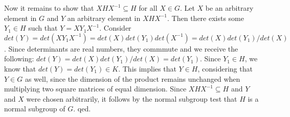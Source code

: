 \documentclass{article}
\begin{document}
Now it remains to show that $XHX^{-1} \subseteq H$ for all $X \in G$. Let $X$ be an arbitrary element in $G$ and $Y$ an arbitrary element in $XHX^{-1}$. Then there exists some $Y_1 \in H$ such that $Y=XY_1X^{-1}$. Consider $det(Y)=det(XY_1X^{-1})=det(X)det(Y_1)det(X^{-1})=det(X)det(Y_1)/det(X)$. Since determinants are real numbers, they commmute and we receive the following: $det(Y)=det(X)det(Y_1)/det(X)=det(Y_1)$. Since $Y_1 \in H$, we know that $det(Y)=det(Y_1) \in K$. This implies that $Y \in H$, considering that $Y \in G$ as well, since the dimension of the product remains unchanged when multiplying two square matrices of equal dimension. Since $XHX^{-1} \subseteq H$ and $Y$ and $X$ were chosen arbitrarily, it follows by the normal subgroup test that $H$ is a normal subgroup of $G$. qed.\\
\end{document}

